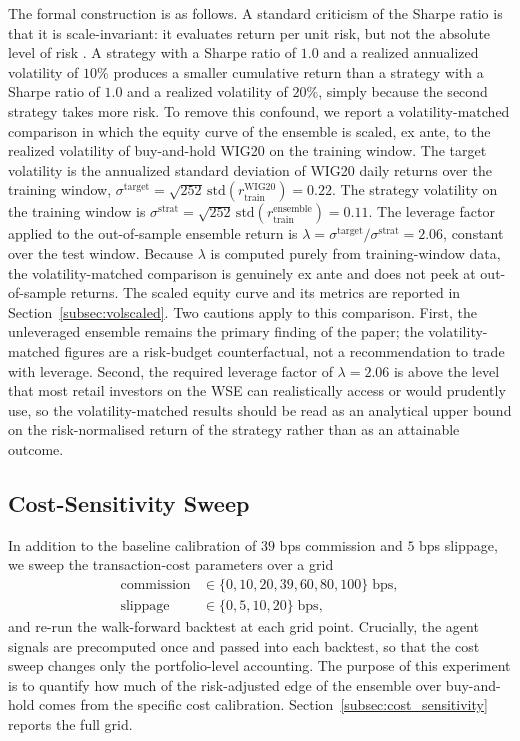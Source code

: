 \documentclass{ieeeaccess}
\newcommand{\Leverage}{\ensuremath{2.06}}
\newcommand{\StrategyTrainVol}{\ensuremath{0.11}}
\newcommand{\BHOosVol}{\ensuremath{0.22}}
\begin{document}
The formal construction is as follows. A standard criticism of the Sharpe ratio is that it is scale-invariant: it evaluates return per unit risk, but not the absolute level of risk \cite{harvey2016}. A strategy with a Sharpe ratio of $1.0$ and a realized annualized volatility of $10\%$ produces a smaller cumulative return than a strategy with a Sharpe ratio of $1.0$ and a realized volatility of $20\%$, simply because the second strategy takes more risk. To remove this confound, we report a volatility-matched comparison in which the equity curve of the ensemble is scaled, ex ante, to the realized volatility of buy-and-hold WIG20 on the training window. The target volatility is the annualized standard deviation of WIG20 daily returns over the training window, $\sigma^{\text{target}} = \sqrt{252}\, \mathrm{std}(r^{\text{WIG20}}_\text{train}) = \BHOosVol{}$. The strategy volatility on the training window is $\sigma^{\text{strat}} = \sqrt{252}\,\mathrm{std}(r^{\text{ensemble}}_\text{train}) = \StrategyTrainVol{}$. The leverage factor applied to the out-of-sample ensemble return is $\lambda = \sigma^{\text{target}} / \sigma^{\text{strat}} = \Leverage{}$, constant over the test window. Because $\lambda$ is computed purely from training-window data, the volatility-matched comparison is genuinely ex ante and does not peek at out-of-sample returns. The scaled equity curve and its metrics are reported in Section~\ref{subsec:volscaled}. Two cautions apply to this comparison. First, the unleveraged ensemble remains the primary finding of the paper; the volatility-matched figures are a risk-budget counterfactual, not a recommendation to trade with leverage. Second, the required leverage factor of $\lambda = \Leverage{}$ is above the level that most retail investors on the WSE can realistically access or would prudently use, so the volatility-matched results should be read as an analytical upper bound on the risk-normalised return of the strategy rather than as an attainable outcome.

\subsection{Cost-Sensitivity Sweep}
\label{subsec:costsweep}

In addition to the baseline calibration of $39$ bps commission and $5$ bps slippage, we sweep the transaction-cost parameters over a grid
\begin{equation}
\begin{aligned}
\mathrm{commission} &\in \{0, 10, 20, 39, 60, 80, 100\}\;\text{bps}, \\
\mathrm{slippage} &\in \{0, 5, 10, 20\}\;\text{bps},
\end{aligned}
\end{equation}
and re-run the walk-forward backtest at each grid point. Crucially, the agent signals are precomputed once and passed into each backtest, so that the cost sweep changes only the portfolio-level accounting. The purpose of this experiment is to quantify how much of the risk-adjusted edge of the ensemble over buy-and-hold comes from the specific cost calibration. Section~\ref{subsec:cost_sensitivity} reports the full grid.
\end{document}
